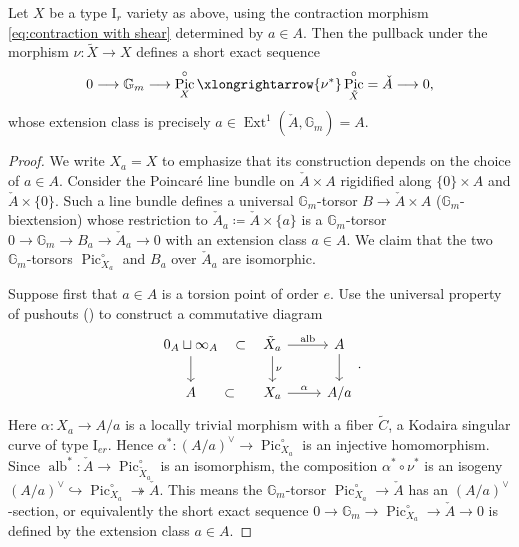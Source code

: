 \documentclass[reqno, letterpaper]{amsart}
\numberwithin{equation}{subsection}
\let\to\longrightarrow
\newcommand{\GG}{\mathbb{G}}
\DeclareMathOperator{\Ext}{Ext}
\DeclareMathOperator{\Pic}{Pic}
\DeclareMathOperator{\alb}{alb}
\begin{document}
			\begin{proposition} \label{prop:shear}
				Let $X$ be a type $\mathrm I_r$ variety as above, using the contraction morphism \eqref{eq:contraction with shear} determined by $a \in A$. Then the pullback under the morphism $\nu : \tilde X \to X$ defines a short exact sequence
				\[ 0 \to \GG_m \to \Pic^\circ_X \xlongrightarrow{\nu^*} \Pic^\circ_{\tilde X} = \check A \to 0 ,\]
				whose extension class is precisely $a \in \Ext^1(\check A, \GG_m) = A$.
			\end{proposition}
			\begin{proof}
				We write $X_a = X$ to emphasize that its construction depends on the choice of $a \in A$. Consider the Poincar\'e line bundle on $\check A \times A$ rigidified along $\{ 0 \} \times A$ and $\check A \times \{ 0 \}$. Such a line bundle defines a universal $\GG_m$-torsor $B \to \check A \times A$ ($\GG_m$-biextension) whose restriction to $\check A_a \coloneq \check A \times \{ a \}$ is a $\GG_m$-torsor $0 \to \GG_m \to B_a \to \check A_a \to 0$ with an extension class $a \in A$. We claim that the two $\GG_m$-torsors $\Pic^\circ_{X_a}$ and $B_a$ over $\check A_a$ are isomorphic.
				
				Suppose first that $a \in A$ is a torsion point of order $e$. Use the universal property of pushouts () to construct a commutative diagram
				\[\begin{tikzcd}
					0_A \sqcup \infty_A \arrow[r, phantom, "\subset"] \arrow[d] & \tilde X_a \arrow[r, "\alb"] \arrow[d, "\nu"] & A \arrow[d] \\
					A \arrow[r, phantom, "\subset"] & X_a \arrow[r, "\alpha"] & A/a
				\end{tikzcd}.\]
				Here $\alpha : X_a \to A/a$ is a locally trivial morphism with a fiber $\tilde C$, a Kodaira singular curve of type $\mathrm I_{er}$. Hence $\alpha^* : (A/a)^\vee \to \Pic_{X_a}^\circ$ is an injective homomorphism. Since $\alb^* : \check A \to \Pic^\circ_{\tilde X_a}$ is an isomorphism, the composition $\alpha^* \circ \nu^*$ is an isogeny $(A/a)^\vee \hookrightarrow \Pic_{X_a}^\circ \twoheadrightarrow \check A$. This means the $\GG_m$-torsor $\Pic_{X_a}^\circ \to \check A$ has an $(A/a)^\vee$-section, or equivalently the short exact sequence $0 \to \GG_m \to \Pic_{X_a}^\circ \to \check A \to 0$ is defined by the extension class $a \in A$.
				
				\medskip
				

\end{proof}
\end{document}

